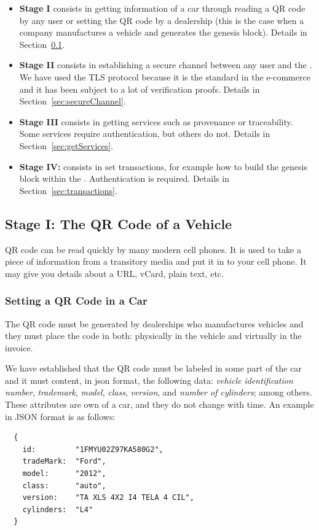 \begin{itemize}
  \item \textbf{Stage I} consists in getting information of a car through reading
    a QR code by any user or setting the QR code by a dealership (this is the 
    case when a company manufactures a vehicle 
    and generates the genesis block). Details in Section~\ref{ssec:qrcode}.
  \item \textbf{Stage II} consists in establishing a secure channel between any user
    and the \blockchaincarnetwork. We
    have used the TLS protocol because it is the standard in the
    e-commerce and it has been subject to a lot of verification proofs.
    Details in Section~\ref{sec:secureChannel}.
  \item \textbf{Stage III} consists in getting services such as provenance or 
    traceability. Some services require authentication, but others do not.
    Details in Section~\ref{sec:getServices}.  
  \item \textbf{Stage IV:} consists in set transactions, for example how to build
    the genesis block within the  \blockchaincarnetwork. Authentication is required. 
    Details in Section~\ref{sec:transactions}. 
\end{itemize}

\subsection{Stage I: The QR Code of a Vehicle}
\label{ssec:qrcode}
QR code can be read quickly by many modern cell phones. It is used to take a piece of information from a 
transitory media and put it in to your cell phone. It may give you details about a URL, vCard, plain text, etc.

\subsubsection{Setting a QR Code in a Car}
\label{sssec:settingQR}
The QR code must be generated by dealerships who manufactures vehicles and they must place the code
in both: physically in the vehicle and virtually in the invoice.

We have established that the QR code must be labeled in some part of the car and it must content,  
in json format, the following data: 
\textit{vehicle identification number}, 
\textit{trademark}, 
\textit{model}, 
\textit{class}, 
\textit{version}, and
\textit{number of cylinders}; 
among others. These attributes are own of a car, and they do not change with time.  
An example in JSON format is as follows:
\begin{lstlisting}
  {
    id:         "1FMYU02Z97KA580G2", 
    tradeMark:  "Ford", 
    model:      "2012", 
    class:      "auto", 
    version:    "TA XLS 4X2 I4 TELA 4 CIL", 
    cylinders:  "L4"
  }
\end{lstlisting}


